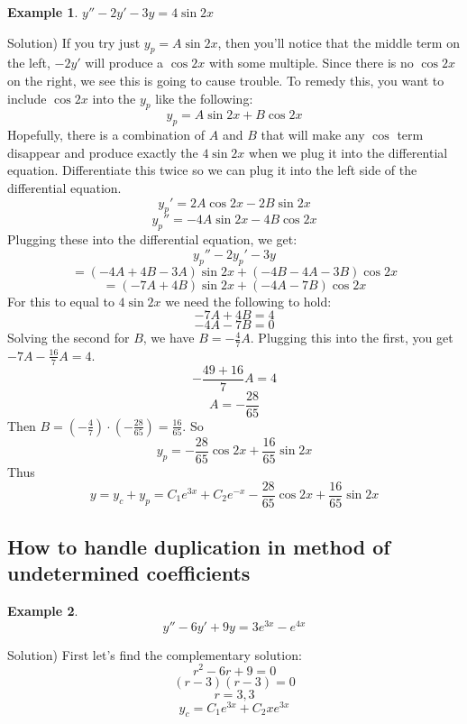 \documentclass[12pt]{report}
\newtheorem{ex}{Example}[section]
\begin{document}
\begin{ex} $y''-2y'-3y= 4 \sin 2x $ \end{ex}
Solution) If you try just $y_p = A \sin 2x$, then you'll notice that the middle term on the left, $-2y'$ will produce a $\cos 2x$ with some multiple. Since there is no $\cos 2x$ on the right, we see this is going to cause trouble. To remedy this, you want to include $\cos 2x$ into the $y_p$ like the following:
$$y_p = A \sin 2x+ B\cos 2x$$
Hopefully, there is a combination of $A$ and $B$ that will make any $\cos$ term disappear and produce exactly the $4 \sin 2x $ when we plug it into the differential equation.
Differentiate this twice so we can plug it into the left side of the differential equation.
$$y_p' = 2A \cos 2x - 2B\sin 2x$$
$$y_p'' = -4A \sin 2x - 4B\cos 2x$$
Plugging these into the differential equation, we get:
$$y_p''-2y_p'-3y$$
$$= (-4A+4B-3A)\sin 2x +(-4B -4A -3B) \cos 2x$$
$$= (-7A+4B)\sin 2x +(-4A -7B) \cos 2x$$
For this to equal to $4 \sin 2x $ we need the following to hold:
$$-7A+4B=4$$
$$-4A-7B=0$$
Solving the second for $B$, we have $B= -\frac{4}{7} A$. Plugging this into the first, you get $-7A -\frac{16}{7} A = 4$.
$$-\frac{49+16}{7} A =4$$
$$A = -\frac{28}{65}$$
Then $B= (-\frac{4}{7})\cdot (-\frac{28}{65})=\frac{16}{65}$. So
$$y_p = -\frac{28}{65} \cos 2x + \frac{16}{65} \sin 2x $$
Thus
$$y= y_c + y_p = C_1 e^{3x} + C_2 e^{-x}  -\frac{28}{65} \cos 2x + \frac{16}{65} \sin 2x $$

\subsection*{ How to handle duplication in method of undetermined coefficients }
\begin{ex}
$$y'' - 6y' +9y = 3 e^{3x}- e^{4x}$$
\end{ex}
Solution)
First let's find the complementary solution:
$$r^2 - 6r +9 =0$$
$$(r-3)(r-3)=0$$
$$r=3,3$$
$$ y_c = C_1 e^{3x} + C_2 x e^{3x} $$
\end{document}
